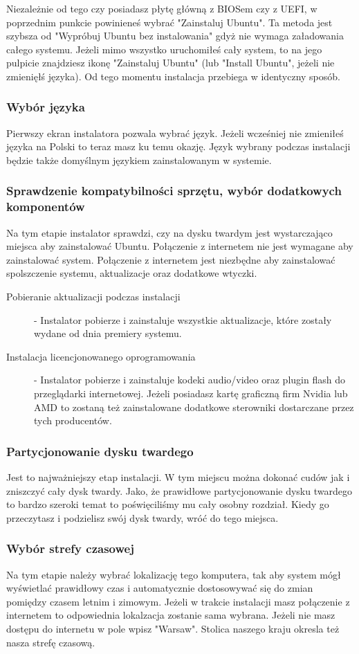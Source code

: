 Niezależnie od tego czy posiadasz płytę główną z BIOSem czy z UEFI, w poprzednim punkcie powinieneś wybrać "Zainstaluj Ubuntu". Ta metoda jest szybsza od "Wypróbuj Ubuntu bez instalowania" gdyż nie wymaga załadowania całego systemu. Jeżeli mimo wszystko uruchomiłeś cały system, to na jego pulpicie znajdziesz ikonę "Zainstaluj Ubuntu" (lub "Install Ubuntu", jeżeli nie zmienięłś języka). Od tego momentu instalacja przebiega w identyczny sposób.
\subsubsection{Wybór języka}
Pierwszy ekran instalatora pozwala wybrać język. Jeżeli wcześniej nie zmieniłeś języka na Polski to teraz masz ku temu okazję. Język wybrany podczas instalacji będzie także domyślnym językiem zainstalowanym w systemie.
\subsubsection{Sprawdzenie kompatybilności sprzętu, wybór dodatkowych komponentów}
Na tym etapie instalator sprawdzi, czy na dysku twardym jest wystarczająco miejsca aby zainstalować Ubuntu. Połączenie z internetem nie jest wymagane aby zainstalować system. Połączenie z internetem jest niezbędne aby zainstalować spolszczenie systemu, aktualizacje oraz dodatkowe wtyczki.
\begin{description}
\item[Pobieranie aktualizacji podczas instalacji] - Instalator pobierze i zainstaluje wszystkie aktualizacje, które zostały wydane od dnia premiery systemu.
\item[Instalacja licencjonowanego oprogramowania] - Instalator pobierze i zainstaluje kodeki audio/video oraz plugin flash do przeglądarki internetowej. Jeżeli posiadasz kartę graficzną firm Nvidia lub AMD to zostaną też zainstalowane dodatkowe sterowniki dostarczane przez tych producentów.
\end{description}
\subsubsection{Partycjonowanie dysku twardego}
Jest to najważniejszy etap instalacji. W tym miejscu można dokonać cudów jak i zniszczyć cały dysk twardy. Jako, że prawidłowe partycjonowanie dysku twardego to bardzo szeroki temat to poświęciliśmy mu cały osobny rozdział. Kiedy go przeczytasz i podzielisz swój dysk twardy, wróć do tego miejsca.
\subsubsection{Wybór strefy czasowej}
Na tym etapie należy wybrać lokalizację tego komputera, tak aby system mógł wyświetlać prawidłowy czas i automatycznie dostosowywać się do zmian pomiędzy czasem letnim i zimowym. Jeżeli w trakcie instalacji masz połączenie z internetem to odpowiednia lokalzacja zostanie sama wybrana. Jeżeli nie masz dostępu do internetu w pole wpisz "Warsaw". Stolica naszego kraju okresla też nasza strefę czasową.
